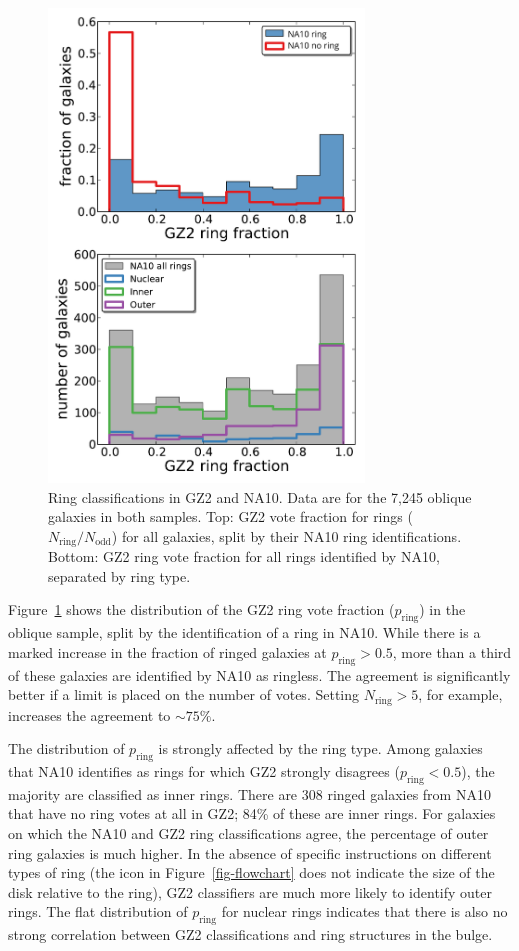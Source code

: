 \documentclass[useAMS,usenatbib]{mn2e}
\begin{document}
\begin{figure}
\includegraphics[angle=0,width=3.3in]{figures/na_gz2_rings_labelfixed.pdf} %
\caption{Ring classifications in GZ2 and NA10. Data are for the 7,245 oblique galaxies in both samples. Top: GZ2 vote fraction for rings ($N_\mathrm{ring}/N_\mathrm{odd}$) for all galaxies, split by their NA10 ring identifications. Bottom: GZ2 ring vote fraction for all rings identified by NA10, separated by ring type.
\label{fig-na_rings}}
\end{figure}

Figure~\ref{fig-na_rings} shows the distribution of the GZ2 ring vote fraction ($p_\mathrm{ring}$) in the oblique sample, split by the identification of a ring in NA10. While there is a marked increase in the fraction of ringed galaxies at $p_\mathrm{ring}>0.5$, more than a third of these galaxies are identified by NA10 as ringless. The agreement is significantly better if a limit is placed on the number of votes. Setting $N_\mathrm{ring} > 5$, for example, increases the agreement to $\sim75\%$. 

The distribution of $p_\mathrm{ring}$ is strongly affected by the ring type. Among galaxies that NA10 identifies as rings for which GZ2 strongly disagrees ($p_\mathrm{ring}<0.5$), the majority are classified as inner rings. There are 308 ringed galaxies from NA10 that have no ring votes at all in GZ2; 84\% of these are inner rings. For galaxies on which the NA10 and GZ2 ring classifications agree, the percentage of outer ring galaxies is much higher. In the absence of specific instructions on different types of ring (the icon in Figure~\ref{fig-flowchart} does not indicate the size of the disk relative to the ring), GZ2 classifiers are much more likely to identify outer rings. The flat distribution of $p_\mathrm{ring}$ for nuclear rings indicates that there is also no strong correlation between GZ2 classifications and ring structures in the bulge. 
\end{document}
